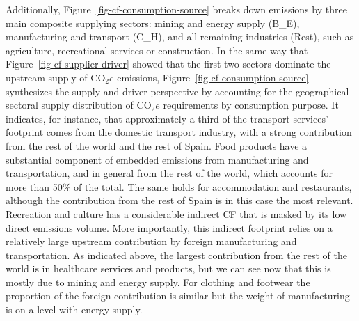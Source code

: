 \documentclass[
  10pt,
  twocolumn]{aft}
\begin{document}
Additionally, Figure~\ref{fig-cf-consumption-source} breaks down
emissions by three main composite supplying sectors: mining and energy
supply (B\_E), manufacturing and transport (C\_H), and all remaining
industries (Rest), such as agriculture, recreational services or
construction. In the same way that Figure~\ref{fig-cf-supplier-driver}
showed that the first two sectors dominate the upstream supply of
\(\text{CO}_2e\) emissions, Figure~\ref{fig-cf-consumption-source}
synthesizes the supply and driver perspective by accounting for the
geographical-sectoral supply distribution of \(\text{CO}_2e\)
requirements by consumption purpose. It indicates, for instance, that
approximately a third of the transport services' footprint comes from
the domestic transport industry, with a strong contribution from the
rest of the world and the rest of Spain. Food products have a
substantial component of embedded emissions from manufacturing and
transportation, and in general from the rest of the world, which
accounts for more than 50\% of the total. The same holds for
accommodation and restaurants, although the contribution from the rest
of Spain is in this case the most relevant. Recreation and culture has a
considerable indirect CF that is masked by its low direct emissions
volume. More importantly, this indirect footprint relies on a relatively
large upstream contribution by foreign manufacturing and transportation.
As indicated above, the largest contribution from the rest of the world
is in healthcare services and products, but we can see now that this is
mostly due to mining and energy supply. For clothing and footwear the
proportion of the foreign contribution is similar but the weight of
manufacturing is on a level with energy supply.
\end{document}
